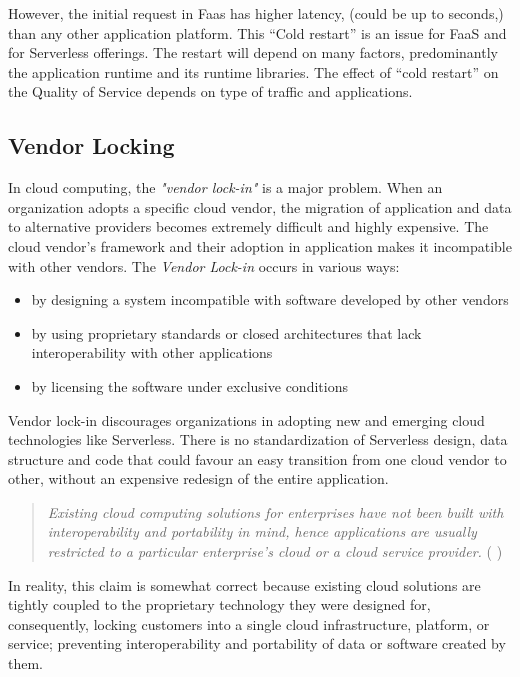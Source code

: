 \documentclass{article}
\begin{document}
\begin{flushleft}
However, the initial request in Faas has higher latency, (could be up to seconds,) than any other application platform. This “Cold restart” is an issue for FaaS and for Serverless offerings. The restart will depend on many factors, predominantly the application runtime and its runtime libraries. The effect of “cold restart” on the Quality of Service depends on type of traffic and applications. 

\subsection{Vendor Locking}
In cloud computing, the \textit{"vendor lock-in"} is a major problem. When an organization adopts a specific cloud vendor, the migration of application and data to alternative providers becomes extremely difficult and highly expensive. The cloud vendor's framework and their adoption in application makes it incompatible with other vendors.
 The \textit{Vendor Lock-in} occurs in various ways: 
 \begin{itemize}
     \item by designing a system incompatible with software developed by other vendors
     \item by using proprietary standards or closed architectures that lack interoperability with other applications
     \item by licensing the software under exclusive conditions
 \end{itemize}

 Vendor lock-in discourages organizations in adopting new and emerging cloud technologies like Serverless. There is no standardization of Serverless design, data structure and code that could favour an easy transition from one cloud vendor to other, without an expensive redesign of the entire application. 

 \begin{quote}
 \textit{
Existing cloud computing solutions for enterprises have not been built with interoperability and portability in mind, hence applications are usually restricted to a particular enterprise's cloud or a cloud service provider.}  
( \cite{Opara-Martins-2014} )
\end{quote}
\par 
In reality, this claim is somewhat correct because existing cloud solutions are tightly coupled to the proprietary technology they were designed for, consequently, locking customers into a single cloud infrastructure, platform, or service; preventing interoperability and portability of data or software created by them. 
\end{flushleft}
\end{document}
